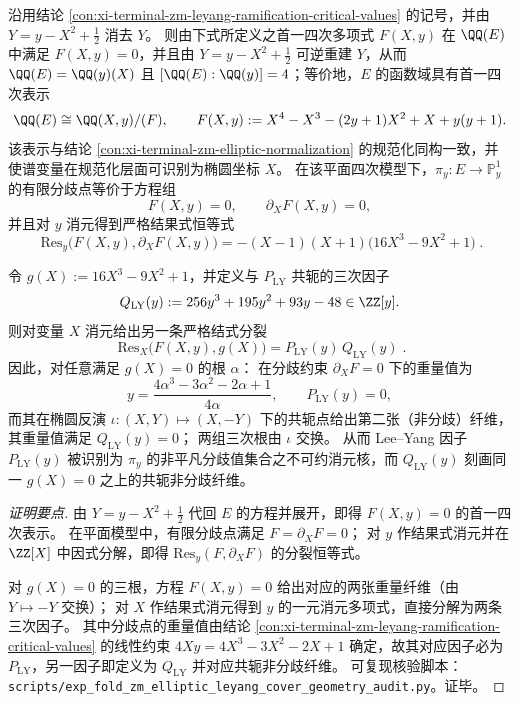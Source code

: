 \begin{conclusion}\label{con:xi-terminal-zm-leyang-conjugate-fiber-cubic}
沿用结论 \ref{con:xi-terminal-zm-leyang-ramification-critical-values} 的记号，并由
\(
Y=y-X^{2}+\tfrac12
\)
消去 \(Y\)。
则由下式所定义之首一四次多项式 \(F(X,y)\) 在 \(\QQ(E)\) 中满足 \(F(X,y)=0\)，并且由 \(Y=y-X^{2}+\tfrac12\) 可逆重建 \(Y\)，从而 \(\QQ(E)=\QQ(y)(X)\) 且 \([\QQ(E):\QQ(y)]=4\)；等价地，\(E\) 的函数域具有首一四次表示
\[
\QQ(E)\cong \QQ(X,y)/(F),
\qquad
F(X,y):=X^{4}-X^{3}-(2y+1)X^{2}+X+y(y+1).
\]
该表示与结论 \ref{con:xi-terminal-zm-elliptic-normalization} 的规范化同构一致，并使谱变量在规范化层面可识别为椭圆坐标 \(X\)。
在该平面四次模型下，\(\pi_y:E\to\mathbb P^{1}_{y}\) 的有限分歧点等价于方程组
\[
F(X,y)=0,\qquad \partial_{X}F(X,y)=0,
\]
并且对 \(y\) 消元得到严格结果式恒等式
\[
\boxed{\;
\mathrm{Res}_{y}\bigl(F(X,y),\partial_{X}F(X,y)\bigr)=-(X-1)(X+1)\bigl(16X^{3}-9X^{2}+1\bigr)\; }.
\]
\par
令
\(
g(X):=16X^{3}-9X^{2}+1
\)，并定义与 \(P_{\mathrm{LY}}\) 共轭的三次因子
\[
Q_{\mathrm{LY}}(y):=256y^{3}+195y^{2}+93y-48\in\ZZ[y].
\]
则对变量 \(X\) 消元给出另一条严格结式分裂
\[
\boxed{\;
\mathrm{Res}_{X}\bigl(F(X,y),g(X)\bigr)=P_{\mathrm{LY}}(y)\,Q_{\mathrm{LY}}(y)\; }.
\]
因此，对任意满足 \(g(X)=0\) 的根 \(\alpha\)：
在分歧约束 \(\partial_XF=0\) 下的重量值为
\[
y=\frac{4\alpha^{3}-3\alpha^{2}-2\alpha+1}{4\alpha},
\qquad
P_{\mathrm{LY}}(y)=0,
\]
而其在椭圆反演 \(\iota:(X,Y)\mapsto (X,-Y)\) 下的共轭点给出第二张（非分歧）纤维，
其重量值满足 \(Q_{\mathrm{LY}}(y)=0\)；
两组三次根由 \(\iota\) 交换。
从而 Lee--Yang 因子 \(P_{\mathrm{LY}}(y)\) 被识别为 \(\pi_y\) 的非平凡分歧值集合之不可约消元核，而 \(Q_{\mathrm{LY}}(y)\) 刻画同一 \(g(X)=0\) 之上的共轭非分歧纤维。
\end{conclusion}
\begin{proof}[证明要点]
由 \(Y=y-X^{2}+\tfrac12\) 代回 \(E\) 的方程并展开，即得 \(F(X,y)=0\) 的首一四次表示。
在平面模型中，有限分歧点满足 \(F=\partial_XF=0\)；
对 \(y\) 作结果式消元并在 \(\ZZ[X]\) 中因式分解，即得 \(\mathrm{Res}_{y}(F,\partial_XF)\) 的分裂恒等式。
\par
对 \(g(X)=0\) 的三根，方程 \(F(X,y)=0\) 给出对应的两张重量纤维（由 \(Y\mapsto -Y\) 交换）；
对 \(X\) 作结果式消元得到 \(y\) 的一元消元多项式，直接分解为两条三次因子。
其中分歧点的重量值由结论 \ref{con:xi-terminal-zm-leyang-ramification-critical-values} 的线性约束
\(
4Xy=4X^{3}-3X^{2}-2X+1
\)
确定，故其对应因子必为 \(P_{\mathrm{LY}}\)，另一因子即定义为 \(Q_{\mathrm{LY}}\) 并对应共轭非分歧纤维。
可复现核验脚本：\texttt{scripts/exp\_fold\_zm\_elliptic\_leyang\_cover\_geometry\_audit.py}。证毕。
\end{proof}

